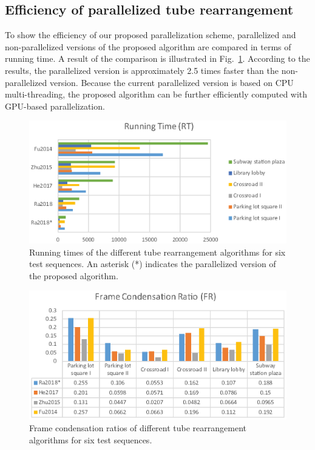\documentclass[11pt]{hyu_thesis}
\begin{document}
\subsection{Efficiency of parallelized tube rearrangement}

To show the efficiency of our proposed parallelization scheme, parallelized and non-parallelized versions of the proposed algorithm are compared in terms of running time. A result of the comparison is illustrated in Fig.~\ref{fig:RT}. According to the results, the parallelized version is approximately 2.5 times faster than the non-parallelized version. Because the current parallelized version is based on CPU multi-threading, the proposed algorithm can be further efficiently computed with GPU-based parallelization.

\begin{figure}[t]
\begin{center}
\includegraphics[width=0.9\linewidth]{RT.eps}
\end{center}
   \caption{Running times of the different tube rearrangement algorithms for six test sequences. An asterisk (*) indicates the parallelized version of the proposed algorithm.}
\label{fig:RT}
\end{figure}

\begin{figure}[t]
\begin{center}
\includegraphics[width=0.9\linewidth]{FCR.eps}
\end{center}
   \caption{Frame condensation ratios of different tube rearrangement algorithms for six test sequences.}
\label{fig:FCR}
\end{figure}
\end{document}
